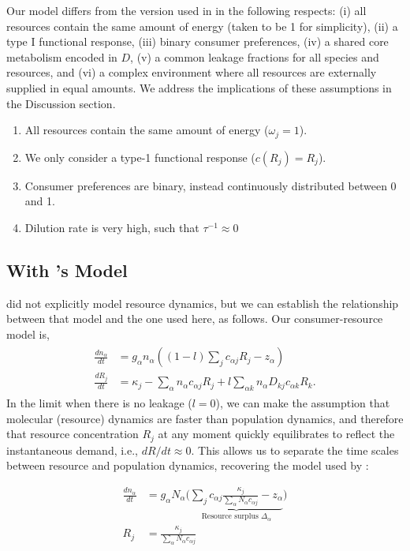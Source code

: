 \documentclass[12pt]{article}
\begin{document}
Our model differs from the version used in \cite{Marsland2019} in the following respects:
(i) all resources contain the same amount of energy (taken to be 1 for simplicity), (ii) a type I functional response, (iii) binary consumer preferences, (iv) a shared core metabolism encoded in $D$, (v) a common leakage fractions for all species and resources, and (vi) a complex environment where all resources are externally supplied in equal amounts. We address the implications of these assumptions in the Discussion section.  
\begin{enumerate}
    \item All resources contain the same amount of energy ($\omega_j = 1$).
    \item We only consider a type-1 functional response ($c(R_j) = R_j$).
    \item Consumer preferences are binary, instead continuously distributed between 0 and 1.
    \item Dilution rate is very high, such that $\tau^{-1}\approx 0$
\end{enumerate}

\subsection*{With \cite{Tikhonov2016}'s Model}

 \cite{Tikhonov2016} did not explicitly model resource dynamics, but we can establish the relationship between that model and the one used here, as follows. Our consumer-resource model is,
\begin{align}
    \begin{split}
        \frac{dn_{\alpha}}{dt} &= g_{\alpha}n_{\alpha}\left((1-l)\sum_j c_{\alpha j}R_j - z_{\alpha}\right)\\
        \frac{dR_{j}}{dt} &= \kappa_j - \sum_{\alpha}n_{\alpha}c_{\alpha j}R_j + l\sum_{\alpha k}n_{\alpha}D_{kj}c_{\alpha k}R_k.
    \end{split}
    \label{eq:model}
\end{align}
In the limit when there is no leakage ($l = 0$), we can make the assumption that molecular (resource) dynamics are faster than population dynamics, and therefore that resource concentration $R_j$ at any moment quickly equilibrates to reflect the instantaneous demand, i.e., $ dR/dt \approx 0 $. This allows us to separate the time scales between resource and population dynamics, recovering the model used by \cite{Tikhonov2016}:

\begin{equation*}
    \begin{aligned}
		\frac{dn_{\alpha}}{dt} &= g_{\alpha}N_{\alpha}\Big(\underbrace{\sum_j c_{{\alpha}j}\frac{\kappa_j}{\sum_{\alpha}N_{\alpha}c_{{\alpha}j}} - z_{\alpha}}_{\text{Resource surplus }\Delta_{\alpha}}\Big)\\
		R_j &= \frac{\kappa_j}{\sum_{\alpha}N_{\alpha}c_{{\alpha}j}}\\
    \end{aligned}
\end{equation*} 
\end{document}

